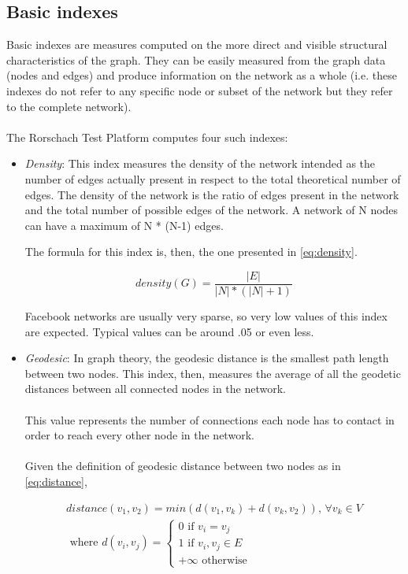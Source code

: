\label{sec:basicindexes}
\subsection{Basic indexes}
Basic indexes are measures computed on the more direct and visible structural characteristics of the graph.
They can be easily measured from the graph data (nodes and edges) and produce information on the network as a whole
(i.e. these indexes do not refer to any specific node or subset of the network but they refer to the complete network).\\
\\
The Rorschach Test Platform computes four such indexes:

\begin{itemize}

\item \emph{Density}: This index measures the density of the network intended as the number of edges actually present in respect to the total theoretical number of edges.
The density of the network is the ratio of edges present in the network and the total number of possible edges of the network.
A network of N nodes can have a maximum of N * (N-1) edges.

The formula for this index is, then, the one presented in \ref{eq:density}.

\begin{equation}
density(G) = 
\frac{\left | E \right |}
{\left | N \right | * \left ( \left | N \right | + 1 \right )}
\label{eq:density}
\end{equation}

Facebook networks are usually very sparse, so very low values of this index are expected.
Typical values can be around .05 or even less.

\item \emph{Geodesic}: In graph theory, the geodesic distance is the smallest path length between two nodes.
This index, then, measures the average of all the geodetic distances between all connected nodes in the network.\\
\\
This value represents the number of connections each node has to contact in order to reach every other node in the network.\\
\\
Given the definition of geodesic distance between two nodes as in \ref{eq:distance},

\begin{equation}
\begin{split}
distance(v_{1}, v_{2}) = min\left ( d(v_{1}, v_{k}) + d(v_{k}, v_{2}) \right )
\textrm{, } \forall v_{k} \in V \\
\textrm{ where }
d(v_{i}, v_{j})=\left \{
\begin{matrix}
0 \textrm{ if } v_{i} = v_{j} \\
1 \textrm{ if } v_{i}, v_{j} \in E \\
+\infty \textrm{ otherwise}
\end{matrix}
\right.
\end{split}
\label{eq:distance}
\end{equation}


\end{itemize}
